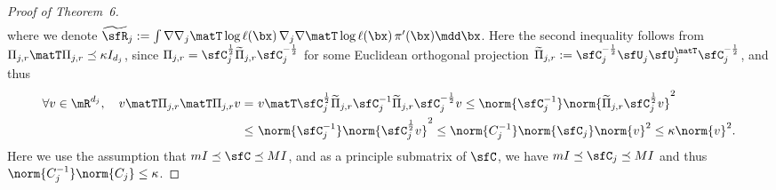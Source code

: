 \documentclass[11pt]{article}
\begin{document}
\begin{proof}[Proof of Theorem~6]
\begin{equation}
\begin{split}
\end{split}
\end{equation}
where we denote $\widetilde{\sfR}_j := \int \nabla \nabla_j\matT \log \ell(\bx)\, \nabla_j \nabla\matT \log \ell(\bx)\, \pi'(\bx) \mdd \bx$. 
Here the second inequality follows from $\Pi_{j,r}\matT \Pi_{j,r}\preceq \kappa I_{d_j}$, since $\Pi_{j,r} = \sfC_{j}^{\frac{1}{2}} \widetilde{\Pi}_{j,r} \sfC_{j}^{-\frac{1}{2}} $ for some Euclidean orthogonal projection $\widetilde{\Pi}_{j,r} := \sfC_j^{-\frac{1}{2}} \sfU_j^{} \sfU_j^{\matT} \sfC_j^{-\frac{1}{2}} $, and thus
\begin{align*}
    \forall v \in \mR^{d_j},\quad v\matT \Pi_{j,r}\matT \Pi_{j,r} v =~& v\matT \sfC_{j}^{\frac{1}{2}} \widetilde{\Pi}_{j,r} \sfC_j^{-1} \widetilde{\Pi}_{j,r} \sfC_{j}^{-\frac{1}{2}} v \le \norm{\sfC_j^{-1}} \norm{ \widetilde{\Pi}_{j,r} \sfC_{j}^{\frac{1}{2}} v }^2 \\
    \le~& \norm{ \sfC_j^{-1}} \norm{ \sfC_{j}^{\frac{1}{2}} v }^2 \le \norm{C_j^{-1}} \norm{ \sfC_{j} } \norm{ v }^2 \le \kappa \norm{v}^2.
\end{align*}
Here we use the assumption that $m I \preceq \sfC \preceq M I$, and as a principle submatrix of $\sfC$, we have $m I \preceq \sfC_j \preceq M I$ and thus $\norm{C_j^{-1}} \norm{ C_{j} } \le \kappa$.



\end{proof}
\end{document}
